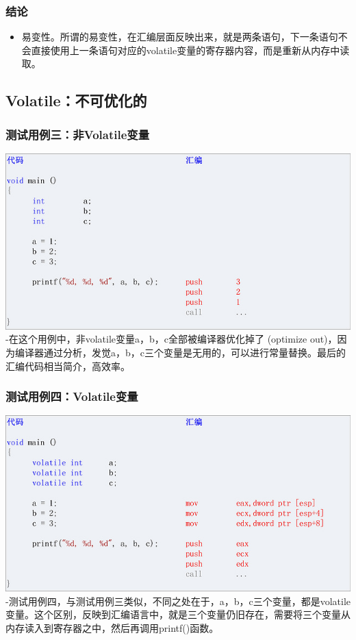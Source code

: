 \documentclass[9pt,b5paper]{article}
\begin{document}
\subsubsection{结论}
\label{sec-9-1-3}
\begin{itemize}
\item 易变性。所谓的易变性，在汇编层面反映出来，就是两条语句，下一条语句不会直接使用上一条语句对应的volatile变量的寄存器内容，而是重新从内存中读取。
\end{itemize}
\subsection{Volatile：不可优化的}
\label{sec-9-2}
\subsubsection{测试用例三：非Volatile变量}
\label{sec-9-2-1}
\includegraphics[width=.9\linewidth]{../pic/v3.jpg}
  -在这个用例中，非volatile变量a，b，c全部被编译器优化掉了 (optimize out)，因为编译器通过分析，发觉a，b，c三个变量是无用的，可以进行常量替换。最后的汇编代码相当简介，高效率。
\subsubsection{测试用例四：Volatile变量}
\label{sec-9-2-2}
\includegraphics[width=.9\linewidth]{../pic/v4.jpg}
  -测试用例四，与测试用例三类似，不同之处在于，a，b，c三个变量，都是volatile变量。这个区别，反映到汇编语言中，就是三个变量仍旧存在，需要将三个变量从内存读入到寄存器之中，然后再调用printf()函数。
\end{document}
